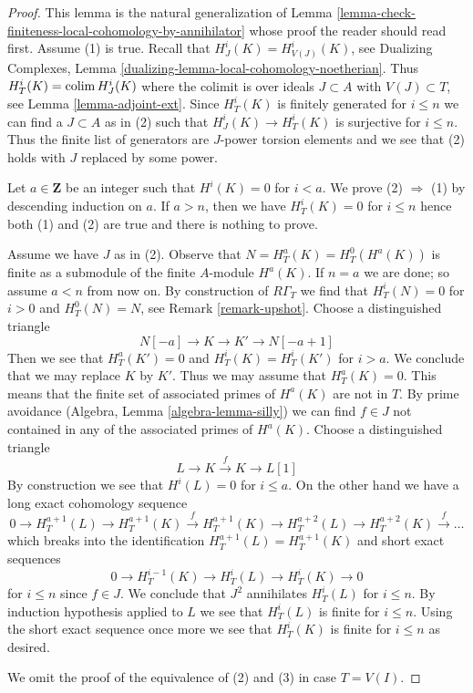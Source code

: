 \begin{proof}
This lemma is the natural generalization of
Lemma \ref{lemma-check-finiteness-local-cohomology-by-annihilator}
whose proof the reader should read first.
Assume (1) is true. Recall that $H^i_J(K) = H^i_{V(J)}(K)$, see
Dualizing Complexes, Lemma \ref{dualizing-lemma-local-cohomology-noetherian}.
Thus $H^i_T(K) = \mathop{\mathrm{colim}}\nolimits H^i_J(K)$ where the colimit is over ideals
$J \subset A$ with $V(J) \subset T$, see
Lemma \ref{lemma-adjoint-ext}. Since $H^i_T(K)$ is finitely generated
for $i \leq n$ we can find a $J \subset A$ as in (2) such that
$H^i_J(K) \to H^i_T(K)$ is surjective for $i \leq n$.
Thus the finite list of generators are $J$-power torsion elements
and we see that (2) holds with $J$ replaced by some power.

\medskip\noindent
Let $a \in \mathbf{Z}$ be an integer such that $H^i(K) = 0$ for $i < a$.
We prove (2) $\Rightarrow$ (1) by descending induction on $a$.
If $a > n$, then we have $H^i_T(K) = 0$ for $i \leq n$ hence both
(1) and (2) are true and there is nothing to prove.

\medskip\noindent
Assume we have $J$ as in (2). Observe that $N = H^a_T(K) = H^0_T(H^a(K))$
is finite as a submodule of the finite $A$-module $H^a(K)$.
If $n = a$ we are done; so assume $a < n$ from now on. By construction of
$R\Gamma_T$ we find that $H^i_T(N) = 0$ for $i > 0$ and $H^0_T(N) = N$, see
Remark \ref{remark-upshot}. Choose a distinguished triangle
$$
N[-a] \to K \to K' \to N[-a + 1]
$$
Then we see that $H^a_T(K') = 0$ and $H^i_T(K) = H^i_T(K')$ for $i > a$.
We conclude that we may replace $K$ by $K'$. Thus we may assume that
$H^a_T(K) = 0$. This means that the finite set of associated primes of
$H^a(K)$ are not in $T$. By prime avoidance
(Algebra, Lemma \ref{algebra-lemma-silly}) we can find $f \in J$
not contained in any of the associated primes of $H^a(K)$.
Choose a distinguished triangle
$$
L \to K \xrightarrow{f} K \to L[1]
$$
By construction we see that $H^i(L) = 0$ for $i \leq a$.
On the other hand we have a long exact cohomology sequence
$$
0 \to H^{a + 1}_T(L) \to H^{a + 1}_T(K) \xrightarrow{f}
H^{a + 1}_T(K) \to H^{a + 2}_T(L) \to H^{a + 2}_T(K) \xrightarrow{f} \ldots
$$
which breaks into the identification $H^{a + 1}_T(L) = H^{a + 1}_T(K)$
and short exact sequences
$$
0 \to H^{i - 1}_T(K) \to H^i_T(L) \to H^i_T(K) \to 0
$$
for $i \leq n$ since $f \in J$.
We conclude that $J^2$ annihilates $H^i_T(L)$ for $i \leq n$.
By induction hypothesis applied to $L$ we see that $H^i_T(L)$
is finite for $i \leq n$. Using the short exact sequence once more
we see that $H^i_T(K)$ is finite for $i \leq n$ as desired.

\medskip\noindent
We omit the proof of the equivalence of (2) and (3)
in case $T = V(I)$.
\end{proof}

